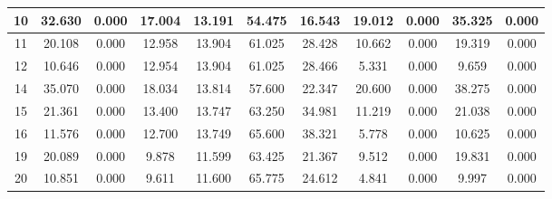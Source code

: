 \begin{table}[]
\begin{tabular}{|c|cc|cc|cc|cc|cc|}
10 & 32.630 & \cellcolor[HTML]{EFEFEF}0.000 & 17.004 & \cellcolor[HTML]{EFEFEF}13.191 & 54.475 & \cellcolor[HTML]{EFEFEF}16.543 & 19.012 & \cellcolor[HTML]{EFEFEF}0.000 & 35.325 & \cellcolor[HTML]{EFEFEF}0.000 \\ \hline
11 & 20.108 & \cellcolor[HTML]{EFEFEF}0.000 & 12.958 & \cellcolor[HTML]{EFEFEF}13.904 & 61.025 & \cellcolor[HTML]{EFEFEF}28.428 & 10.662 & \cellcolor[HTML]{EFEFEF}0.000 & 19.319 & \cellcolor[HTML]{EFEFEF}0.000 \\ \hline
12 & 10.646 & \cellcolor[HTML]{EFEFEF}0.000 & 12.954 & \cellcolor[HTML]{EFEFEF}13.904 & 61.025 & \cellcolor[HTML]{EFEFEF}28.466 & 5.331 & \cellcolor[HTML]{EFEFEF}0.000 & 9.659 & \cellcolor[HTML]{EFEFEF}0.000 \\ \hline
14 & 35.070 & \cellcolor[HTML]{EFEFEF}0.000 & 18.034 & \cellcolor[HTML]{EFEFEF}13.814 & 57.600 & \cellcolor[HTML]{EFEFEF}22.347 & 20.600 & \cellcolor[HTML]{EFEFEF}0.000 & 38.275 & \cellcolor[HTML]{EFEFEF}0.000 \\ \hline
15 & 21.361 & \cellcolor[HTML]{EFEFEF}0.000 & 13.400 & \cellcolor[HTML]{EFEFEF}13.747 & 63.250 & \cellcolor[HTML]{EFEFEF}34.981 & 11.219 & \cellcolor[HTML]{EFEFEF}0.000 & 21.038 & \cellcolor[HTML]{EFEFEF}0.000 \\ \hline
16 & 11.576 & \cellcolor[HTML]{EFEFEF}0.000 & 12.700 & \cellcolor[HTML]{EFEFEF}13.749 & 65.600 & \cellcolor[HTML]{EFEFEF}38.321 & 5.778 & \cellcolor[HTML]{EFEFEF}0.000 & 10.625 & \cellcolor[HTML]{EFEFEF}0.000 \\ \hline
19 & 20.089 & \cellcolor[HTML]{EFEFEF}0.000 & 9.878 & \cellcolor[HTML]{EFEFEF}11.599 & 63.425 & \cellcolor[HTML]{EFEFEF}21.367 & 9.512 & \cellcolor[HTML]{EFEFEF}0.000 & 19.831 & \cellcolor[HTML]{EFEFEF}0.000 \\ \hline
20 & 10.851 & \cellcolor[HTML]{EFEFEF}0.000 & 9.611 & \cellcolor[HTML]{EFEFEF}11.600 & 65.775 & \cellcolor[HTML]{EFEFEF}24.612 & 4.841 & \cellcolor[HTML]{EFEFEF}0.000 & 9.997 & \cellcolor[HTML]{EFEFEF}0.000 \\ \hline
\end{tabular}
\end{table}
